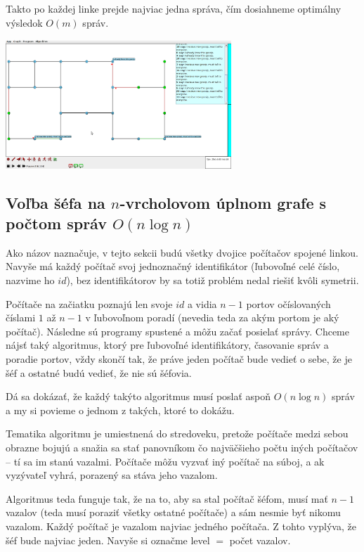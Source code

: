Takto po každej linke prejde najviac jedna správa, čím dosiahneme optimálny výsledok $O(m)$ správ.

\noindent
\includegraphics[width=8.5cm]{BFS.png}

\subsection{Voľba šéfa na $n$-vrcholovom úplnom grafe s počtom správ $O(n\log n)$}

Ako názov naznačuje, v tejto sekcii budú všetky dvojice počítačov spojené linkou. 
Navyše má každý počítač svoj jednoznačný identifikátor (ľubovoľné celé číslo, nazvime ho $id$), bez identifikátorov
by sa totiž problém nedal riešiť kvôli symetrii.

Počítače na začiatku poznajú len svoje $id$ a vidia $n-1$ portov očíslovaných číslami $1$ až $n-1$ v
ľubovoľnom poradí (nevedia teda za akým portom je aký počítač). Následne sú programy spustené a môžu začať posielať správy.
Chceme nájsť taký algoritmus, ktorý pre ľubovoľné identifikátory, časovanie správ a poradie
portov, vždy skončí tak, že práve jeden počítač bude vedieť o sebe, že je šéf a ostatné budú vedieť, že nie sú šéfovia.

Dá sa dokázať, že každý takýto algoritmus musí poslať aspoň $O(n\log n)$ správ a my si povieme o
jednom z takých, ktoré to dokážu.

Tematika algoritmu je umiestnená do stredoveku, pretože počítače medzi sebou obrazne bojujú a snažia
sa stať panovníkom čo najväčšieho počtu iných počítačov -- tí sa im stanú vazalmi. 
Počítače môžu vyzvať iný počítač na súboj, a ak vyzývateľ vyhrá, porazený sa stáva jeho vazalom.

Algoritmus teda funguje tak, že na to, aby sa stal počítač šéfom, musí mať $n-1$ vazalov (teda musí
poraziť všetky ostatné počítače) a sám nesmie byť nikomu vazalom. Každý počítač je vazalom najviac 
jedného počítača. Z tohto vyplýva, že šéf bude najviac jeden. Navyše si označme level $=$ počet vazalov.

